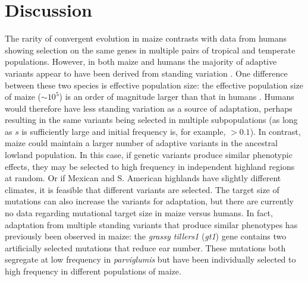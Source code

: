 \section*{Discussion}
The rarity of convergent evolution in maize contrasts with data from humans \citep{Tennessen_2011_21698142} showing selection on the same genes in multiple pairs of tropical and temperate populations.  
However, in both maize and humans the majority of adaptive variants appear to have been derived from standing variation \cite[]{Tennessen_2011_21698142}.
One difference between these two species is effective population size: the effective population size of maize ($\sim10^5$) is an order of magnitude larger than that in humans \cite[]{Takahata_1997_9114074}.
Humans would therefore have less standing variation as a source of adaptation, perhaps resulting in the same variants being selected in multiple subpopulations (as long as $s$ is sufficiently large and initial frequency is, for example, $>0.1$).
In contrast, maize could maintain a larger number of adaptive variants in the ancestral lowland population.
In this case, if genetic variants produce similar phenotypic effects, they may be selected to high frequency in independent highland regions at random.
Or if Mexican and S. American highlands have slightly different climates, it is feasible that different variants are selected.
The target size of mutations can also increase the variants for adaptation, but there are currently no data regarding mutational target size in maize versus humans.
 
In fact, adaptation from multiple standing variants that produce similar phenotypes has previously been observed in maize: the \emph{grassy tillers1} (\emph{gt1}) gene \cite[]{Wills_2013_23825971} contains two artificially selected mutations that reduce ear number.
These mutations both segregate at low frequency in \emph{parviglumis} but have been individually selected to high frequency in different populations of maize.


